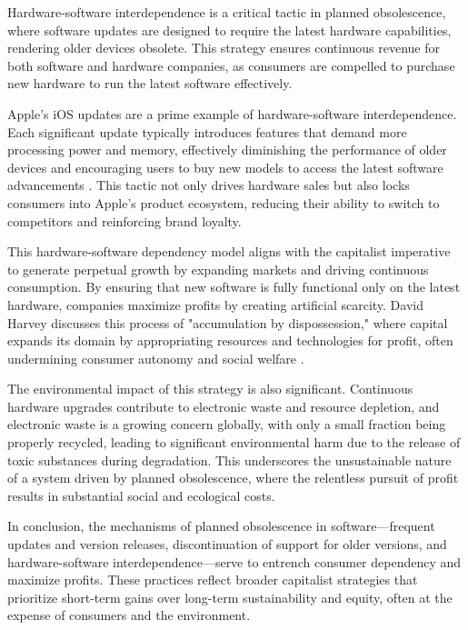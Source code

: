 \begin{refsection}
Hardware-software interdependence is a critical tactic in planned obsolescence, where software updates are designed to require the latest hardware capabilities, rendering older devices obsolete. This strategy ensures continuous revenue for both software and hardware companies, as consumers are compelled to purchase new hardware to run the latest software effectively.

Apple’s iOS updates are a prime example of hardware-software interdependence. Each significant update typically introduces features that demand more processing power and memory, effectively diminishing the performance of older devices and encouraging users to buy new models to access the latest software advancements \cite[pp.~132-135]{vogelstein2014dogfight}. This tactic not only drives hardware sales but also locks consumers into Apple’s product ecosystem, reducing their ability to switch to competitors and reinforcing brand loyalty.

This hardware-software dependency model aligns with the capitalist imperative to generate perpetual growth by expanding markets and driving continuous consumption. By ensuring that new software is fully functional only on the latest hardware, companies maximize profits by creating artificial scarcity. David Harvey discusses this process of "accumulation by dispossession," where capital expands its domain by appropriating resources and technologies for profit, often undermining consumer autonomy and social welfare \cite[pp.~137-139]{harvey2010new}.

The environmental impact of this strategy is also significant. Continuous hardware upgrades contribute to electronic waste and resource depletion, and electronic waste is a growing concern globally, with only a small fraction being properly recycled, leading to significant environmental harm due to the release of toxic substances during degradation. This underscores the unsustainable nature of a system driven by planned obsolescence, where the relentless pursuit of profit results in substantial social and ecological costs.

In conclusion, the mechanisms of planned obsolescence in software—frequent updates and version releases, discontinuation of support for older versions, and hardware-software interdependence—serve to entrench consumer dependency and maximize profits. These practices reflect broader capitalist strategies that prioritize short-term gains over long-term sustainability and equity, often at the expense of consumers and the environment.


\end{refsection}
